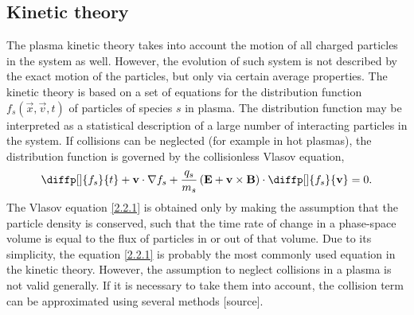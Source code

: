 \subsection{Kinetic theory}
The plasma kinetic theory takes into account the motion of all charged particles in the system as well. However, the evolution of such system is not described by the exact motion of the particles, but only via certain average properties. The kinetic theory is based on a set of equations for the distribution function $ f_s \left(\vec{x}, \vec{v}, t \right) $ of particles of species $ s $ in plasma. The distribution function may be interpreted as a statistical description of a large number of interacting particles in the system. If collisions can be neglected (for example in hot plasmas), the distribution function is governed by the collisionless Vlasov equation,
\begin{equation}
\label{2.2.1}
\diffp[]{f_{s}}{t} + \vec{v} \cdot \nabla f_s + \frac{q_{s}}{m_{s}}\left( \vec{E} + \vec{v} \times \vec{B} \right) \cdot \diffp[]{f_s}{\vec{v}} = 0.
\end{equation}
The Vlasov equation \ref{2.2.1} is obtained only by making the assumption that the particle density is conserved, such that the time rate of change in a phase-space volume is equal to the flux of particles in or out of that volume. Due to its simplicity, the equation \ref{2.2.1} is probably the most commonly used equation in the kinetic theory. However, the assumption to neglect collisions in a plasma is not valid generally. If it is necessary to take them into account, the collision term can be approximated using several methods [source].
 
